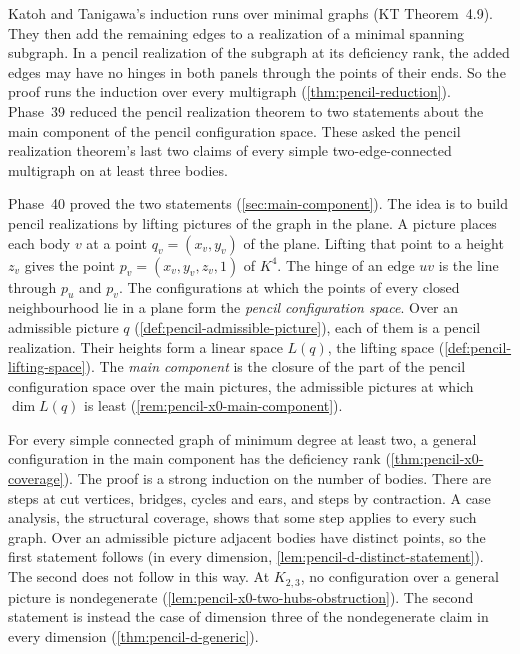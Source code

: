 Katoh and Tanigawa's induction runs over minimal graphs (KT
Theorem~4.9). They then add the remaining edges to a realization of a
minimal spanning subgraph. In a pencil realization of the subgraph at its
deficiency rank, the added edges may have no hinges in both panels
through the points of their ends. So the proof runs the induction over
every multigraph (\cref{thm:pencil-reduction}). Phase~39 reduced the
pencil realization theorem to two statements about the main component of
the pencil configuration space. These asked the pencil realization
theorem's last two claims of every simple two-edge-connected multigraph on
at least three bodies.

Phase~40 proved the two statements (\cref{sec:main-component}). The idea
is to build pencil realizations by lifting pictures of the graph in the
plane. A picture places each body $v$ at a point $q_v = (x_v, y_v)$ of
the plane. Lifting that point to a height $z_v$ gives the point
$p_v = (x_v, y_v, z_v, 1)$ of $K^4$. The hinge of an edge $uv$ is the line
through $p_u$ and $p_v$. The configurations at which the points of every
closed neighbourhood lie in a plane form the \emph{pencil configuration
space}. Over an admissible picture $q$
(\cref{def:pencil-admissible-picture}), each of them is a pencil
realization. Their heights form a linear space $L(q)$, the lifting space
(\cref{def:pencil-lifting-space}). The \emph{main component} is the
closure of the part of the pencil configuration space over the main
pictures, the admissible pictures at which $\dim L(q)$ is least
(\cref{rem:pencil-x0-main-component}).

For every simple connected graph of minimum degree at least two, a
general configuration in the main component has the deficiency rank
(\cref{thm:pencil-x0-coverage}). The proof is a strong induction
on the number of bodies. There are steps at cut vertices, bridges, cycles
and ears, and steps by contraction. A case analysis, the structural
coverage, shows that some step applies to every such graph. Over an
admissible picture adjacent bodies have distinct points, so the first statement follows (in every
dimension, \cref{lem:pencil-d-distinct-statement}). The second does not
follow in this way. At $K_{2,3}$, no configuration over a general picture is
nondegenerate (\cref{lem:pencil-x0-two-hubs-obstruction}). The second
statement is instead the case of dimension three of the nondegenerate
claim in every dimension (\cref{thm:pencil-d-generic}).

